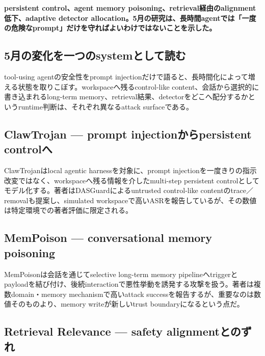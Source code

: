 \noindent\textbf{persistent control、agent memory poisoning、retrieval経由のalignment低下、adaptive detector allocation。5月の研究は、長時間agentでは「一度の危険なprompt」だけを守ればよいわけではないことを示した。}\autocite{src-062c2718dd96,src-7fa0ea6bcf47,src-b818bca6d4b6,src-f216d6cd7707}

\subsection{5月の変化を一つのsystemとして読む}

tool-using agentの安全性をprompt injectionだけで語ると、長時間化によって増える状態を取りこぼす。workspaceへ残るcontrol-like content、会話から選択的に書き込まれるlong-term memory、retrieval結果、detectorをどこへ配分するかというruntime判断は、それぞれ異なるattack surfaceである。\autocite{src-062c2718dd96,src-7fa0ea6bcf47,src-b818bca6d4b6,src-f216d6cd7707}


\subsection{ClawTrojan — prompt injectionからpersistent controlへ}

ClawTrojanはlocal agentic harnessを対象に、prompt injectionを一度きりの指示改変ではなく、workspaceへ残る情報を介したmulti-step persistent controlとしてモデル化する。著者はDASGuardによるuntrusted control-like contentのtrace／removalも提案し、simulated workspaceで高いASRを報告しているが、その数値は特定環境での著者評価に限定される。\autocite{src-7fa0ea6bcf47}


\subsection{MemPoison — conversational memory poisoning}

MemPoisonは会話を通じてselective long-term memory pipelineへtriggerとpayloadを結び付け、後続interactionで悪性挙動を誘発する攻撃を扱う。著者は複数domain・memory mechanismで高いattack successを報告するが、重要なのは数値そのものより、memory writeが新しいtrust boundaryになるという点だ。\autocite{src-f216d6cd7707}


\subsection{Retrieval Relevance — safety alignmentとのずれ}

